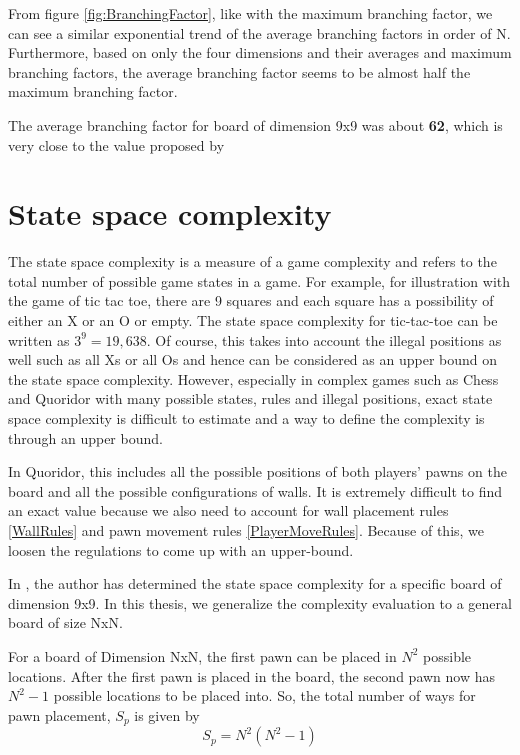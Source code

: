 From figure \ref{fig:BranchingFactor}, like with the maximum branching factor, we can see a similar exponential trend of the average branching factors in order of N. Furthermore, based on only the four dimensions and their averages and maximum branching factors, the average branching factor seems to be almost half the maximum branching factor.

The average branching factor for board of dimension 9x9 was about \textbf{62}, which is very close to the value proposed by \citep{Glendenning2002MasteringQ}

\section{State space complexity}

The state space complexity is a measure of a game complexity and refers to the total number of possible game states in a game. For example, for illustration with the game of tic tac toe, there are 9 squares and each square has a possibility of either an X or an O or empty. The state space complexity for tic-tac-toe can be written as $3^9 = 19,638$. Of course, this takes into account the illegal positions as well such as all Xs or all Os and hence can be considered as an upper bound on the state space complexity. However, especially in complex games such as Chess and Quoridor with many possible states, rules and illegal positions, exact state space complexity is difficult to estimate and a way to define the complexity is through an upper bound.  

In Quoridor, this includes all the possible positions of both players' pawns on the board and all the possible configurations of walls. It is extremely difficult to find an exact value because we also need to account for wall placement rules \ref{WallRules} and pawn movement rules \ref{PlayerMoveRules}. Because of this, we loosen the regulations to come up with an upper-bound.

In \citep{Mertens2006Quoridor}, the author has determined the state space complexity for a specific board of dimension 9x9. In this thesis, we generalize the complexity evaluation to a general board of size NxN.

For a board of Dimension NxN, the first pawn can be placed in $N^2$ possible locations. After the first pawn is placed in the board, the second pawn now has $N^2-1$ possible locations to be placed into. So, the total number of ways for pawn placement, $S_p$ is given by
\begin{equation}
    S_p = N^2(N^2 - 1)
\end{equation}


